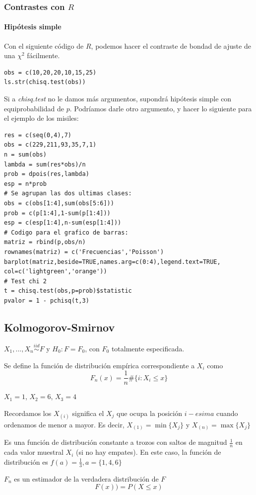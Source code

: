 \subsubsection{Contrastes con $R$}
\paragraph{Hipótesis simple}
Con el siguiente código de $R$, podemos hacer el contraste de bondad de ajuste de una $\chi^2$ fácilmente.

\begin{lstlisting}[style=mystyle]
obs = c(10,20,20,10,15,25)
ls.str(chisq.test(obs))
\end{lstlisting}

Si a \textit{chisq.test} no le damos más argumentos, supondrá hipótesis simple con equiprobabilidad de $p$. Podríamos darle otro argumento, y hacer lo siguiente para el ejemplo de los misiles:

\begin{lstlisting}[style=mystyle]
res = c(seq(0,4),7)
obs = c(229,211,93,35,7,1)
n = sum(obs)
lambda = sum(res*obs)/n
prob = dpois(res,lambda)
esp = n*prob
# Se agrupan las dos ultimas clases:
obs = c(obs[1:4],sum(obs[5:6]))
prob = c(p[1:4],1-sum(p[1:4]))
esp = c(esp[1:4],n-sum(esp[1:4]))
# Codigo para el grafico de barras:
matriz = rbind(p,obs/n)
rownames(matriz) = c('Frecuencias','Poisson')
barplot(matriz,beside=TRUE,names.arg=c(0:4),legend.text=TRUE,
col=c('lightgreen','orange'))
# Test chi 2
t = chisq.test(obs,p=prob)$statistic
pvalor = 1 - pchisq(t,3)
\end{lstlisting}



\subsection{Kolmogorov-Smirnov}

\begin{defn}

$X_1,...,X_n \overset{iid}{\sim} F$ y $H_0 : F=F_0$, con $F_0$ totalmente especificada.

Se define la función de distribución empírica correspondiente a $X_i$ como \[F_n(x) = \frac{1}{n}\#\{ i : X_i\leq x\}\]

\end{defn}

\begin{example}
$X_1 = 1$, $X_2 = 6$, $X_3 = 4$

Recordamos los  $X_{(i)}$ significa el $X_j$ que ocupa la posición $i-esima$ cuando ordenamos de menor a mayor. Es decir, $X_{(1)} = \min\{X_j\}$ y $X_{(n)} = \max\{X_j\}$ 

Es una función de distribución constante a trozos con saltos de magnitud $\frac{1}{n}$ en cada valor muestral $X_i$ (si no hay empates). En este caso, la función de distribución es $f(a) = \frac{1}{3}, a=\{1,4,6\}$

$F_n$ es un estimador de la verdadera distribución de $F$ \[F(x)) = P(X\leq x)\]
\end{example}

